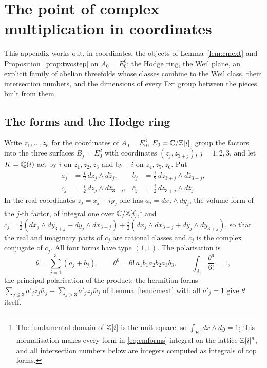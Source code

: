 \section{The point of complex multiplication in coordinates}\label{app:cmpoint}

This appendix works out, in coordinates, the objects of Lemma~\ref{lem:cmext} and Proposition~\ref{prop:twostep} on $A_{0}=E_{0}^{6}$: the Hodge ring, the Weil plane, an explicit family of abelian threefolds whose classes combine to the Weil class, their intersection numbers, and the dimensions of every Ext group between the pieces built from them.

\subsection{The forms and the Hodge ring}\label{app:forms}

Write $z_{1},\dots,z_{6}$ for the coordinates of $A_{0}=E_{0}^{6}$, $E_{0}=\mathbb{C}/\mathbb{Z}[i]$, group the factors into the three surfaces $B_{j}=E_{0}^{2}$ with coordinates $(z_{j},z_{3+j})$, $j=1,2,3$, and let $K=\mathbb{Q}(i)$ act by $i$ on $z_{1},z_{2},z_{3}$ and by $-i$ on $z_{4},z_{5},z_{6}$. Put
\begin{equation}\label{eq:cmforms}
\begin{aligned}
a_{j}&=\tfrac{i}{2}\,dz_{j}\wedge d\bar z_{j}, &
b_{j}&=\tfrac{i}{2}\,dz_{3+j}\wedge d\bar z_{3+j},\\
c_{j}&=\tfrac{i}{2}\,dz_{j}\wedge d\bar z_{3+j}, &
\bar c_{j}&=\tfrac{i}{2}\,dz_{3+j}\wedge d\bar z_{j}.
\end{aligned}
\end{equation}
In the real coordinates $z_{j}=x_{j}+iy_{j}$ one has $a_{j}=dx_{j}\wedge dy_{j}$, the volume form of the $j$-th factor, of integral one over $\mathbb{C}/\mathbb{Z}[i]$,\footnote{The fundamental domain of $\mathbb{Z}[i]$ is the unit square, so $\int_{E_{0}}dx\wedge dy=1$; this normalisation makes every form in \eqref{eq:cmforms} integral on the lattice $\mathbb{Z}[i]^{6}$, and all intersection numbers below are integers computed as integrals of top forms.} and $c_{j}=\tfrac12(dx_{j}\wedge dy_{3+j}-dy_{j}\wedge dx_{3+j})+\tfrac{i}{2}(dx_{j}\wedge dx_{3+j}+dy_{j}\wedge dy_{3+j})$, so that the real and imaginary parts of $c_{j}$ are rational classes and $\bar c_{j}$ is the complex conjugate of $c_{j}$. All four forms have type $(1,1)$. The polarisation is
\begin{equation}\label{eq:cmtheta}
\theta=\sum_{j=1}^{3}(a_{j}+b_{j}),\qquad \theta^{6}=6!\,a_{1}b_{1}a_{2}b_{2}a_{3}b_{3},\qquad \int_{A_{0}}\frac{\theta^{6}}{6!}=1,
\end{equation}
the principal polarisation of the product; the hermitian forms $\sum_{j\le3}a'_{j}z_{j}\bar w_{j}-\sum_{j>3}a'_{j}z_{j}\bar w_{j}$ of Lemma~\ref{lem:cmext} with all $a'_{j}=1$ give $\theta$ itself.


